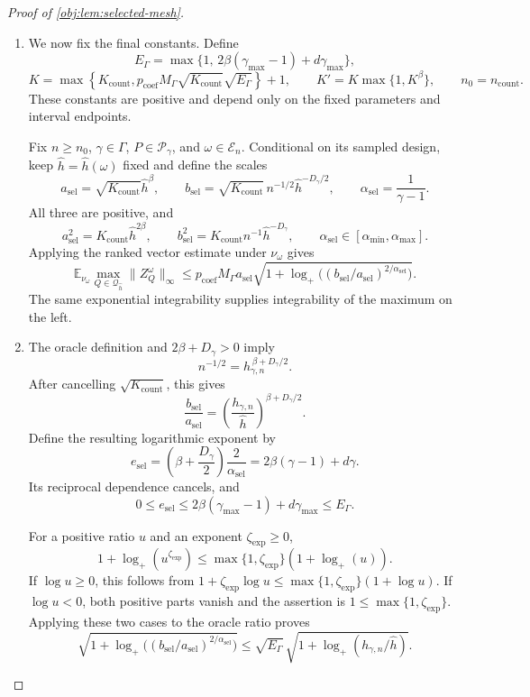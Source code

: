 \documentclass[11pt]{article}
\begin{document}
\begin{proof}[Proof of \cref{obj:lem:selected-mesh}]
\begin{enumerate}
\item We now fix the final constants. Define
\[
E_\Gamma
=
\max\{1,\,2\beta(\gamma_{\max}-1)+d\gamma_{\max}\},
\]
\[
K=
\max\!\left\{
K_{\mathrm{count}},
p_{\mathrm{coef}}M_\Gamma
\sqrt{K_{\mathrm{count}}}\sqrt{E_\Gamma}
\right\}+1,
\qquad
K'=K\max\{1,K^\beta\},
\qquad
n_0=n_{\mathrm{count}}.
\]
These constants are positive and depend only on the fixed parameters
and interval endpoints.

Fix \(n\ge n_0\), \(\gamma\in\Gamma\), \(P\in\mathcal P_\gamma\), and
\(\omega\in\mathcal E_n\). Conditional on its sampled design, keep
\(\widehat h=\widehat h(\omega)\) fixed and define the scales
\[
a_{\mathrm{sel}}
=
\sqrt{K_{\mathrm{count}}}\widehat h^\beta,
\qquad
b_{\mathrm{sel}}
=
\sqrt{K_{\mathrm{count}}}\,
n^{-1/2}\widehat h^{-D_\gamma/2},
\qquad
\alpha_{\mathrm{sel}}=\frac1{\gamma-1}.
\]
All three are positive, and
\[
a_{\mathrm{sel}}^2
=K_{\mathrm{count}}\widehat h^{2\beta},
\qquad
b_{\mathrm{sel}}^2
=K_{\mathrm{count}}n^{-1}\widehat h^{-D_\gamma},
\qquad
\alpha_{\mathrm{sel}}\in[\alpha_{\min},\alpha_{\max}].
\]
Applying the ranked vector estimate under \(\nu_\omega\) gives
\[
\mathbb E_{\nu_\omega}
\max_{Q\in\mathcal Q_{\widehat h}}\|Z_Q^\omega\|_\infty
\le
p_{\mathrm{coef}}M_\Gamma a_{\mathrm{sel}}
\sqrt{
1+\log_+\bigl((b_{\mathrm{sel}}/a_{\mathrm{sel}})
^{2/\alpha_{\mathrm{sel}}}\bigr)
}.
\]
The same exponential integrability supplies integrability of the
maximum on the left.

\item The oracle definition and \(2\beta+D_\gamma>0\) imply
\[
n^{-1/2}
=h_{\gamma,n}^{\,\beta+D_\gamma/2}.
\]
After cancelling \(\sqrt{K_{\mathrm{count}}}\), this gives
\[
\frac{b_{\mathrm{sel}}}{a_{\mathrm{sel}}}
=
\left(\frac{h_{\gamma,n}}{\widehat h}\right)^{
\beta+D_\gamma/2}.
\]
Define the resulting logarithmic exponent by
\[
e_{\mathrm{sel}}
=
\left(\beta+\frac{D_\gamma}{2}\right)
\frac2{\alpha_{\mathrm{sel}}}
=
2\beta(\gamma-1)+d\gamma.
\]
Its reciprocal dependence cancels, and
\[
0\le e_{\mathrm{sel}}
\le2\beta(\gamma_{\max}-1)+d\gamma_{\max}
\le E_\Gamma.
\]

For a positive ratio \(u\) and an exponent \(\zeta_{\mathrm{exp}}\ge0\),
\[
1+\log_+(u^{\zeta_{\mathrm{exp}}})
\le\max\{1,\zeta_{\mathrm{exp}}\}(1+\log_+(u)).
\]
If \(\log u\ge0\), this follows from
\(1+\zeta_{\mathrm{exp}}\log u\le\max\{1,\zeta_{\mathrm{exp}}\}(1+\log u)\).
If \(\log u<0\), both positive parts vanish and the assertion is
\(1\le\max\{1,\zeta_{\mathrm{exp}}\}\). Applying these two cases to the oracle ratio proves
\[
\sqrt{
1+\log_+\bigl((b_{\mathrm{sel}}/a_{\mathrm{sel}})
^{2/\alpha_{\mathrm{sel}}}\bigr)
}
\le
\sqrt{E_\Gamma}\,
\sqrt{1+\log_+(h_{\gamma,n}/\widehat h)}.
\]


\end{enumerate}
\end{proof}
\end{document}
